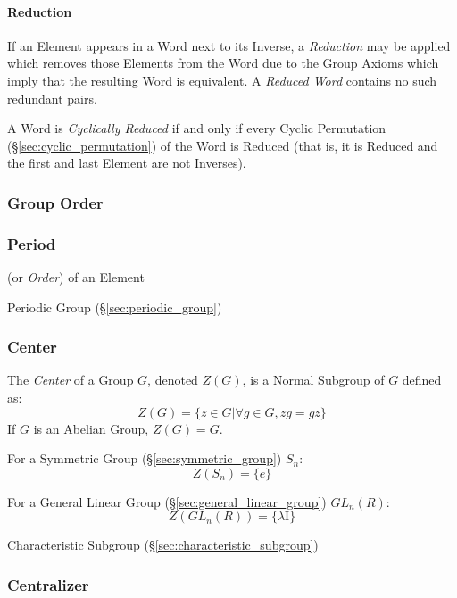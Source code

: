 \paragraph{Reduction}\label{sec:word_reduction}\hfill

If an Element appears in a Word next to its Inverse, a \emph{Reduction} may be
applied which removes those Elements from the Word due to the Group Axioms which
imply that the resulting Word is equivalent. A \emph{Reduced Word} contains no
such redundant pairs.

A Word is \emph{Cyclically Reduced} if and only if every Cyclic Permutation
(\S\ref{sec:cyclic_permutation}) of the Word is Reduced (that is, it is Reduced
and the first and last Element are not Inverses).



\subsubsection{Group Order}\label{sec:group_order}

\subsubsection{Period}\label{sec:group_period}

(or \emph{Order}) of an Element

Periodic Group (\S\ref{sec:periodic_group})



\subsubsection{Center}\label{sec:group_center}

The \emph{Center} of a Group $G$, denoted $Z(G)$, is a Normal Subgroup of $G$
defined as:
\[
    Z(G) = \{ z \in G | \forall g \in G, zg = gz \}
\]
If $G$ is an Abelian Group, $Z(G) = G$.

For a Symmetric Group (\S\ref{sec:symmetric_group}) $S_n$:
\[
    Z(S_n) = \{e\}
\]

For a General Linear Group (\S\ref{sec:general_linear_group}) $GL_n(R)$:
\[
    Z(GL_n(R)) = \{\lambda \mathrm{I}\}
\]

Characteristic Subgroup (\S\ref{sec:characteristic_subgroup})



\subsubsection{Centralizer}\label{sec:group_centralizer}

